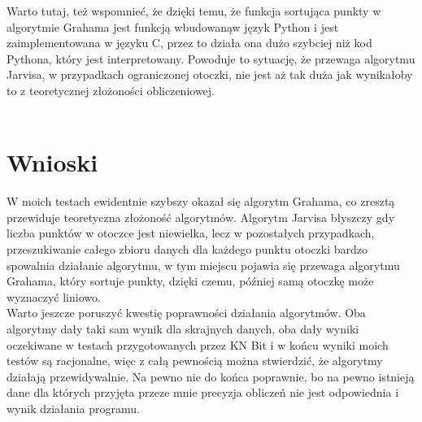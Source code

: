 \documentclass[a4paper]{article}
\begin{document}
Warto tutaj, też wspomnieć, że dzięki temu, że funkcja sortująca punkty w algorytmie Grahama jest funkcją wbudowanąw język Python i jest zaimplementowana w języku C, przez
to działa ona dużo szybciej niż kod Pythona, który jest interpretowany. Powoduje to sytuację, że przewaga algorytmu Jarvisa, w przypadkach ograniczonej otoczki, nie jest aż tak duża jak wynikałoby to z teoretycznej złożoności obliczeniowej.\\\\
\pagebreak

\section{Wnioski}
W moich testach ewidentnie szybszy okazał się algorytm Grahama, co zresztą przewiduje teoretyczna złożoność algorytmów.
Algorytm Jarvisa błyszczy gdy liczba punktów w otoczce jest niewielka, lecz w pozostałych przypadkach, przeszukiwanie całego
zbioru danych dla każdego punktu otoczki bardzo spowalnia działanie algorytmu, w tym miejscu pojawia się przewaga algorytmu 
Grahama, który sortuje punkty, dzięki czemu, później samą otoczkę może wyznaczyć liniowo.\\

\noindent Warto jeszcze poruszyć kwestię poprawności działania algorytmów. Oba algorytmy dały taki sam wynik dla skrajnych danych,
oba dały wyniki oczekiwane w testach przygotowanych przez KN Bit i w końcu wyniki moich testów są racjonalne, więc z całą
pewnością można stwierdzić, że algorytmy działają przewidywalnie. Na pewno nie do końca poprawnie, bo na pewno istnieją dane 
dla których przyjęta przeze mnie precyzja obliczeń nie jest odpowiednia i wynik działania programu.
\end{document}

